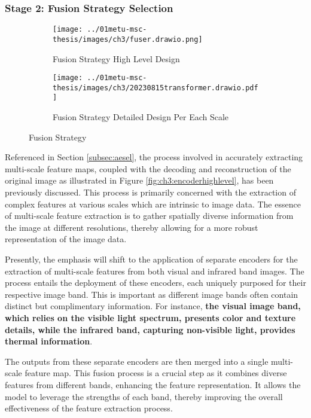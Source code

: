 \subsubsection{Stage 2: Fusion Strategy Selection} \label{subsec:fusion}

\begin{figure}[htbp]
    \begin{subfigure}[b]{\textwidth}
        \centering
        \texttt{[image: ../01metu-msc-thesis/images/ch3/fuser.drawio.png]}
        \caption{Fusion Strategy High Level Design}
        \label{fig:ch3:fusionhighlevel}
    \end{subfigure}
    \begin{subfigure}[b]{\textwidth}
        \centering
        \texttt{[image: ../01metu-msc-thesis/images/ch3/20230815transformer.drawio.pdf]}
        \caption{Fusion Strategy Detailed Design Per Each Scale}
        \label{fig:ch3:fusiondetailed}
    \end{subfigure}
    \caption{Fusion Strategy}
    \label{fig:ch3:fusion}
\end{figure}

Referenced in Section \ref{subsec:aesel}, the process involved in accurately extracting multi-scale feature maps, coupled with the decoding and reconstruction of the original image as illustrated in Figure \ref{fig:ch3:encoderhighlevel}, has been previously discussed. This process is primarily concerned with the extraction of complex features at various scales which are intrinsic to image data. The essence of multi-scale feature extraction is to gather spatially diverse information from the image at different resolutions, thereby allowing for a more robust representation of the image data.

Presently, the emphasis will shift to the application of separate encoders for the extraction of multi-scale features from both visual and infrared band images. The process entails the deployment of these encoders, each uniquely purposed for their respective image band. This is important as different image bands often contain distinct but complimentary information. For instance, \textbf{the visual image band, which relies on the visible light spectrum, presents color and texture details, while the infrared band, capturing non-visible light, provides thermal information}.

The outputs from these separate encoders are then merged into a single multi-scale feature map. This fusion process is a crucial step as it combines diverse features from different bands, enhancing the feature representation. It allows the model to leverage the strengths of each band, thereby improving the overall effectiveness of the feature extraction process.

